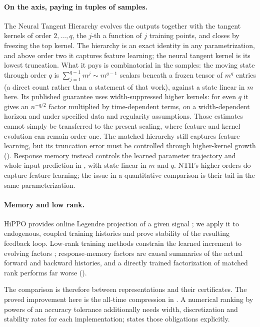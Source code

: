 \documentclass[11pt]{article}
\theoremstyle{definition}
\theoremstyle{remark}
\begin{document}
\paragraph{On the axis, paying in tuples of samples.}
The Neural Tangent Hierarchy \citep{huang2020nth} evolves the outputs together
with the tangent kernels of order $2,\dots,q$, the $j$-th a function of $j$
training points, and closes by freezing the top kernel.  The hierarchy is an
exact identity in any parametrization, and above order two it captures feature
learning; the neural tangent kernel is its lowest truncation.  What it pays is
combinatorial in the samples: the moving state through order $q$ is
$\sum_{j=1}^{q-1}m^j\sim m^{q-1}$ scalars beneath a frozen tensor of $m^q$
entries (a direct count rather than a statement of that work), against a state
linear in $m$ here.  Its published guarantee uses width-suppressed higher
kernels: for even $q$ it gives an $n^{-q/2}$ factor multiplied by
time-dependent terms, on
a width-dependent horizon and under specified data and regularity assumptions.
Those estimates cannot simply be transferred to the present scaling, where
feature and kernel evolution can remain order one.  The matched hierarchy
still captures feature learning, but its truncation error must be controlled
through higher-kernel growth ().
Response memory instead controls the learned parameter trajectory and
whole-input prediction in , with state linear in $m$ and
$q$.  NTH's higher orders do capture feature learning; the issue in a
quantitative comparison is their tail in the same parameterization.

\paragraph{Memory and low rank.}
HiPPO provides online Legendre projection of a given signal \citep{gu2020hippo};
we apply it to endogenous, coupled training histories and prove stability of the
resulting feedback loop.  Low-rank training methods constrain the learned
increment to evolving factors \citep{zhao2023inrank}; response-memory factors are
causal summaries of the actual forward and backward histories, and a directly
trained factorization of matched rank performs far worse
().

The comparison is therefore between representations and their certificates.
The proved improvement here is the all-time compression in
.  A numerical ranking by powers of an accuracy
tolerance additionally needs width, discretization and stability rates for
each implementation;  states those obligations explicitly.
\end{document}
